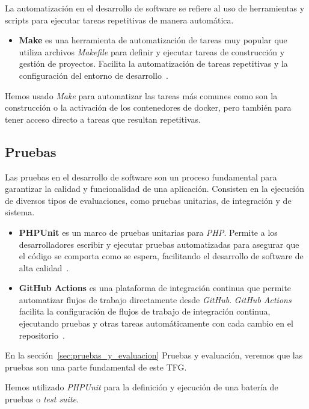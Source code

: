 La automatización en el desarrollo de software se refiere al uso de herramientas y scripts para ejecutar tareas
repetitivas de manera automática.

\begin{itemize}
    \item
    \textbf{Make} es una herramienta de automatización de tareas muy popular que utiliza archivos \textit{Makefile} para
    definir y ejecutar tareas de construcción y gestión de proyectos.
    Facilita la automatización de tareas repetitivas y la configuración del entorno de desarrollo~\cite{url_make}.
\end{itemize}

Hemos usado \textit{Make} para automatizar las tareas más comunes como son la construcción o la activación de los
contenedores de docker, pero también para tener acceso directo a tareas que resultan repetitivas.

\subsection*{Pruebas}

Las pruebas en el desarrollo de software son un proceso fundamental para garantizar la calidad y funcionalidad de una
aplicación.
Consisten en la ejecución de diversos tipos de evaluaciones, como pruebas unitarias, de integración y de sistema.

\begin{itemize}
    \item
    \textbf{PHPUnit} es un marco de pruebas unitarias para \textit{PHP}.
    Permite a los desarrolladores escribir y ejecutar pruebas automatizadas para asegurar que el código se comporta como
    se espera, facilitando el desarrollo de software de alta calidad~\cite{url_phpunit}.

    \item
    \textbf{GitHub Actions}
    es una plataforma de integración continua que permite automatizar flujos de trabajo directamente desde
    \textit{GitHub}.
    \textit{GitHub Actions} facilita la configuración de flujos de trabajo de integración continua, ejecutando
    pruebas y otras tareas automáticamente con cada cambio en el repositorio~\cite{url_github_actions}.
\end{itemize}

En la sección~\ref{sec:pruebas_y_evaluacion} Pruebas y evaluación, veremos que las pruebas son una parte fundamental
de este TFG.

Hemos utilizado \textit{PHPUnit} para la definición y ejecución de una batería de pruebas o \textit{test suite}.

